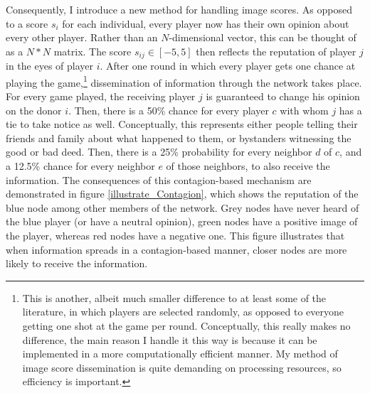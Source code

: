 \documentclass[12pt]{article}
\begin{document}
Consequently, I introduce a new method for handling image scores. As opposed to a score $s_i$ for each individual, every player now has their own opinion about every other player. Rather than an $N$-dimensional vector, this can be thought of as a $N*N$ matrix. The score $s_{ij}\in [-5,5]$ then reflects the reputation of player $j$ in the eyes of player $i$. After one round in which every player gets one chance at playing the game,\footnote{This is another, albeit much smaller difference to at least some of the literature, in which players are selected randomly, as opposed to everyone getting one shot at the game per round. Conceptually, this really makes no difference, the main reason I handle it this way is because it can be implemented in a more computationally efficient manner. My method of image score dissemination is quite demanding on processing resources, so efficiency is important.} dissemination of information through the network takes place. For every game played, the receiving player $j$ is guaranteed to change his opinion on the donor $i$. Then, there is a 50\% chance for every player $c$ with whom $j$ has a tie to take notice as well. Conceptually, this represents either people telling their friends and family about what happened to them, or bystanders witnessing the good or bad deed. Then, there is a 25\% probability for every neighbor $d$ of $c$, and a 12.5\% chance for every neighbor $e$ of those neighbors, to also receive the information. The consequences of this contagion-based mechanism are demonstrated in figure \ref{illustrate_Contagion}, which shows the reputation of the blue node among other members of the network. Grey nodes have never heard of the blue player (or have a neutral opinion), green nodes have a positive image of the player, whereas red nodes have a negative one. This figure illustrates that when information spreads in a contagion-based manner, closer nodes are more likely to receive the information.
\end{document}
